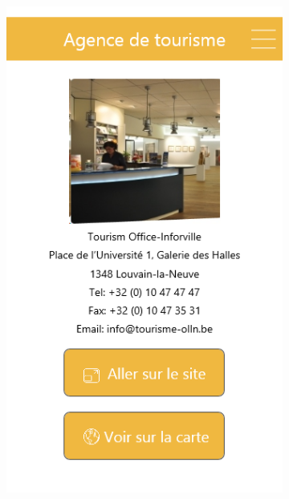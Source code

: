 \documentclass{eplmastersthesis}
\begin{document}
\begin{figure}[H]
\begin{subfigure}[b]{0.3\textwidth}
        \includegraphics[width=\textwidth]{Images/InVision/agence.png}
    \end{subfigure}
    ~ %
    \begin{subfigure}[b]{0.3\textwidth}

\end{subfigure}
\end{figure}
\end{document}
